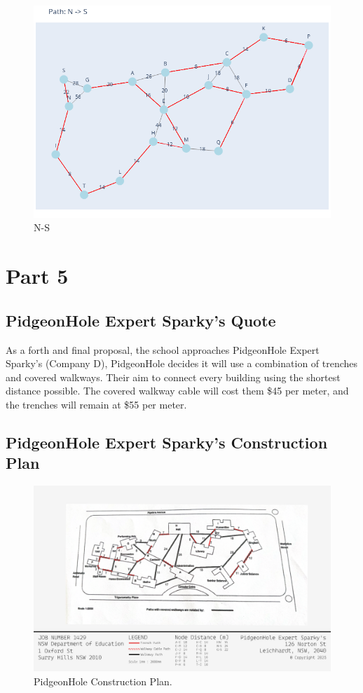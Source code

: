 \documentclass[11pt]{book}
\renewcommand{\=}[1]{\stackrel{#1}{=}} %
\theoremstyle{definition}
\theoremstyle{remark}
\begin{document}
\begin{figure}
    \centering
    \includegraphics[width=1\linewidth]{Trenches/17.png}
    \caption{N-S}
    \label{fig:enter-label}
\end{figure}

\chapter{Part 5}
\section{PidgeonHole Expert Sparky's Quote}
As a forth and final proposal, the school approaches PidgeonHole Expert Sparky's (Company D), PidgeonHole decides it will use a combination of trenches and covered walkways. Their aim to connect every building using the shortest distance possible. The covered walkway cable will cost them \$45 per meter, and the trenches will remain at \$55 per meter.



\section{PidgeonHole Expert Sparky's Construction Plan}
\begin{figure}
    \centering
    \includegraphics[width=1\linewidth]{img/PidgeonHole Construction Plan.png}
    \caption{PidgeonHole Construction Plan.}
    \label{fig:enter-label}
\end{figure}
\end{document}
